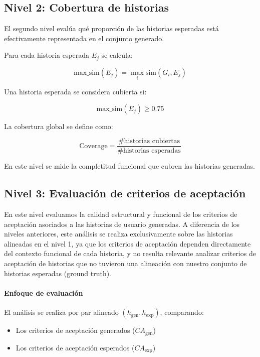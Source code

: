 \subsection{Nivel 2: Cobertura de historias}
El segundo nivel evalúa qué proporción de las historias esperadas está
efectivamente representada en el conjunto generado.

Para cada historia esperada $E_j$ se calcula:

\[
\text{max\_sim}(E_j) = \max_i \text{sim}(G_i, E_j)
\]

Una historia esperada se considera cubierta si:

\[
\text{max\_sim}(E_j) \geq 0.75
\]

La cobertura global se define como:

\[
\text{Coverage} =
\frac{\# \text{historias cubiertas}}
{\# \text{historias esperadas}}
\]

En este nivel se mide la completitud funcional que cubren las historias generadas.

\subsection{Nivel 3: Evaluación de criterios de aceptación}

En este nivel evaluamos la calidad estructural y funcional de los criterios de aceptación asociados a las historias de usuario generadas. A diferencia de los niveles anteriores, este análisis se realiza exclusivamente sobre las historias alineadas en el nivel 1, ya que los criterios de aceptación dependen directamente del contexto funcional de cada historia, y no resulta relevante analizar criterios de aceptación de historias que no tuvieron una alineación con nuestro conjunto de historias esperadas (ground truth).

\paragraph{Enfoque de evaluación}

El análisis se realiza por par alineado $(h_{\text{gen}}, h_{\text{exp}})$, comparando:

\begin{itemize}
    \item Los criterios de aceptación generados ($CA_{\text{gen}}$)
    \item Los criterios de aceptación esperados ($CA_{\text{exp}}$)
\end{itemize}

